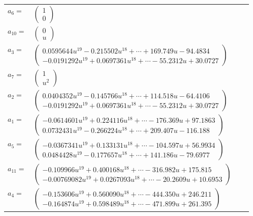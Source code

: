 \documentclass[1p]{elsarticle_modified}
\theoremstyle{definition}
\begin{document}
\begin{tabular}{m{7pt} m{180pt} m{7pt} m{180pt} }
\flushright $a_{6}=$&$\begin{pmatrix}1\\0\end{pmatrix}$ \\
\flushright $a_{10}=$&$\begin{pmatrix}0\\u\end{pmatrix}$ \\
\flushright $a_{3}=$&$\begin{pmatrix}0.0595644 u^{19}-0.215502 u^{18}+\cdots+169.749 u-94.4834\\-0.0191292 u^{19}+0.0697361 u^{18}+\cdots-55.2312 u+30.0727\end{pmatrix}$ \\
\flushright $a_{7}=$&$\begin{pmatrix}1\\u^2\end{pmatrix}$ \\
\flushright $a_{2}=$&$\begin{pmatrix}0.0404352 u^{19}-0.145766 u^{18}+\cdots+114.518 u-64.4106\\-0.0191292 u^{19}+0.0697361 u^{18}+\cdots-55.2312 u+30.0727\end{pmatrix}$ \\
\flushright $a_{1}=$&$\begin{pmatrix}-0.0614601 u^{19}+0.224116 u^{18}+\cdots-176.369 u+97.1863\\0.0732431 u^{19}-0.266224 u^{18}+\cdots+209.407 u-116.188\end{pmatrix}$ \\
\flushright $a_{5}=$&$\begin{pmatrix}-0.0367341 u^{19}+0.133131 u^{18}+\cdots-104.597 u+56.9934\\0.0484428 u^{19}-0.177657 u^{18}+\cdots+141.186 u-79.6977\end{pmatrix}$ \\
\flushright $a_{11}=$&$\begin{pmatrix}-0.109966 u^{19}+0.400168 u^{18}+\cdots-316.982 u+175.815\\-0.00769082 u^{19}+0.0267093 u^{18}+\cdots-20.2609 u+10.6953\end{pmatrix}$ \\
\flushright $a_{4}=$&$\begin{pmatrix}-0.153606 u^{19}+0.560090 u^{18}+\cdots-444.350 u+246.211\\-0.164874 u^{19}+0.598489 u^{18}+\cdots-471.899 u+261.395\end{pmatrix}$ \\

\end{tabular}
\end{document}
